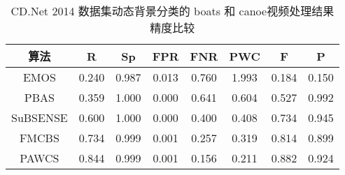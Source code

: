  \begin{table}[ht]
\caption{CD.Net 2014 数据集\cite{CD2014}动态背景分类的 boats 和 canoe视频处理结果精度比较}
\label{ch4:tab:resultsDB}
\begin{center}
\begin{tabular}{cccccccc} %
\toprule[1.5pt]
\rule[-1ex]{0pt}{3.5ex}  算法 &R &Sp & FPR & FNR &PWC &F &P\\
\hline
\rule[-1ex]{0pt}{3.5ex}  EMOS\cite{Chien2002Efficient}&  0.240&0.987&0.013&0.760&1.993&0.184&0.150 \\

\rule[-1ex]{0pt}{3.5ex}  PBAS\cite{pbas}&0.359&1.000&0.000&0.641&0.604&0.527&0.992  \\

\rule[-1ex]{0pt}{3.5ex}  SuBSENSE\cite{subsenseTIP}&  0.600&1.000&0.000&0.400&0.408&0.734&0.945 \\

\rule[-1ex]{0pt}{3.5ex}  FMCBS &  0.734 & 0.999 & 0.001 & 0.257 &0.319&0.814&0.899\\

\rule[-1ex]{0pt}{3.5ex}  PAWCS\cite{Stcharles2015A}&0.844&0.999&0.001&0.156&0.211&0.882&0.924\\
\bottomrule[1.5pt]
\end{tabular}
\end{center}
\end{table}


